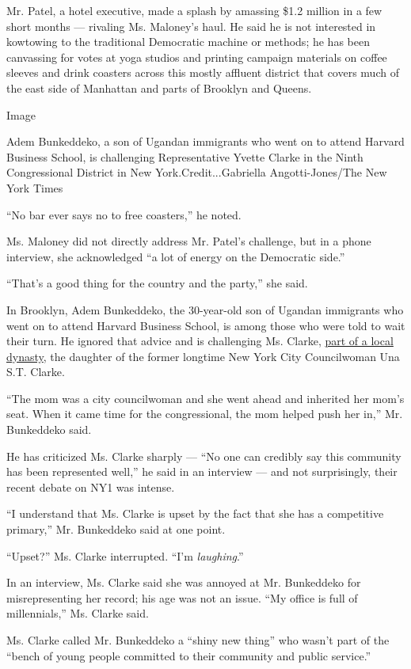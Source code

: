 Mr. Patel, a hotel executive, made a splash by amassing \$1.2 million in
a few short months --- rivaling Ms. Maloney's haul. He said he is not
interested in kowtowing to the traditional Democratic machine or
methods; he has been canvassing for votes at yoga studios and printing
campaign materials on coffee sleeves and drink coasters across this
mostly affluent district that covers much of the east side of Manhattan
and parts of Brooklyn and Queens.

Image

Adem Bunkeddeko, a son of Ugandan immigrants who went on to attend
Harvard Business School, is challenging Representative Yvette Clarke in
the Ninth Congressional District in New York.Credit...Gabriella
Angotti-Jones/The New York Times

``No bar ever says no to free coasters,'' he noted.

Ms. Maloney did not directly address Mr. Patel's challenge, but in a
phone interview, she acknowledged ``a lot of energy on the Democratic
side.''

``That's a good thing for the country and the party,'' she said.

In Brooklyn, Adem Bunkeddeko, the 30-year-old son of Ugandan immigrants
who went on to attend Harvard Business School, is among those who were
told to wait their turn. He ignored that advice and is challenging Ms.
Clarke,
\href{https://www.nytimes3xbfgragh.onion/2006/09/14/nyregion/14yvette.html}{part
of a local dynasty}, the daughter of the former longtime New York City
Councilwoman Una S.T. Clarke.

``The mom was a city councilwoman and she went ahead and inherited her
mom's seat. When it came time for the congressional, the mom helped push
her in,'' Mr. Bunkeddeko said.

He has criticized Ms. Clarke sharply --- ``No one can credibly say this
community has been represented well,'' he said in an interview --- and
not surprisingly, their recent debate on NY1 was intense.

``I understand that Ms. Clarke is upset by the fact that she has a
competitive primary,'' Mr. Bunkeddeko said at one point.

``Upset?'' Ms. Clarke interrupted. ``I'm \emph{laughing}.''

In an interview, Ms. Clarke said she was annoyed at Mr. Bunkeddeko for
misrepresenting her record; his age was not an issue. ``My office is
full of millennials,'' Ms. Clarke said.

Ms. Clarke called Mr. Bunkeddeko a ``shiny new thing'' who wasn't part
of the ``bench of young people committed to their community and public
service.''

